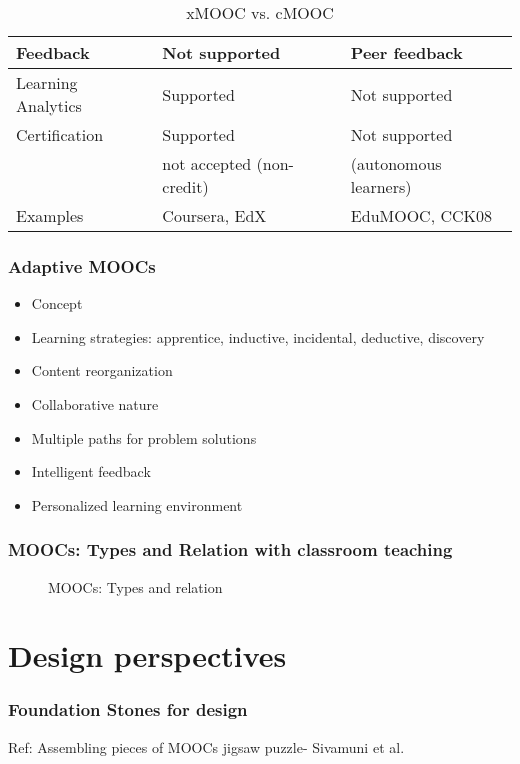 \documentclass[13pt]{beamer}
\begin{document}
\begin{frame}
\begin{table}[ht]
{\begin{tabular}{|l|l|l|}
        Feedback                   & Not supported                       & Peer feedback     \\ \hline
        Learning Analytics         & Supported                           & Not supported                                                                \\ \hline
        Certification	           & Supported 				 & Not supported \\
        ~ 			   & not accepted (non-credit)		 &(autonomous learners)                                         \\ \hline
        Examples		   & Coursera, EdX			 & EduMOOC, CCK08 \\
        \hline
    \end{tabular}}
    \caption{xMOOC vs. cMOOC}\label{tab:xmoocvscmooc}
\end{table}
\end{frame}

\begin{frame}
	    \frametitle{Adaptive MOOCs}
	    \begin{itemize}
		\item Concept
		\item Learning strategies: apprentice, inductive, incidental, deductive, discovery
		\item Content reorganization
		\item Collaborative nature
		\item Multiple paths for problem solutions
		\item Intelligent feedback
		\item Personalized learning environment

	    \end{itemize}
\end{frame}

\begin{frame}
\frametitle{MOOCs: Types and Relation with classroom teaching}
 	\begin{figure}[ht]
	    \begin{center}
	    \end{center}
	    \caption{MOOCs: Types and relation}
	\end{figure}
\end{frame}


\section{Design perspectives}
\begin{frame}
	\frametitle{Foundation Stones for design}
	\begin{figure}[ht]
	    \begin{center}
	    \end{center}
	\end{figure} 
    Ref: Assembling pieces of MOOCs jigsaw puzzle- Sivamuni et al.
\end{frame}
\end{document}
